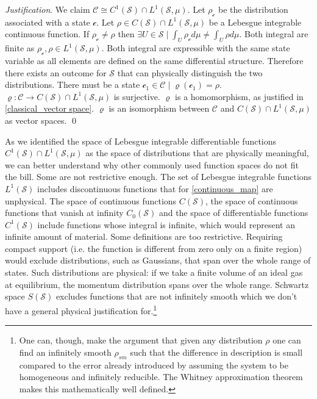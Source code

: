 \documentclass[aps,pra,10pt,twocolumn,floatfix,nofootinbib]{revtex4-1}
\numberwithin{equation}{section}
\theoremstyle{definition}
\newenvironment{justification}{\emph{Justification}.}{\qed}
\begin{document}
\begin{justification}
	We claim $\mathcal{C} \cong C^1(\mathcal{S}) \cap L^1(\mathcal{S}, \mu)$. Let $\rho_\mathcal{c}$ be the distribution associated with a state $\mathcal{c}$. Let $\rho \in C(\mathcal{S}) \cap  L^1(\mathcal{S}, \mu)$ be a Lebesgue integrable continuous function. If $\rho_\mathcal{c} \neq \rho$ then $\exists U \in \mathcal{S} \; | \; \int_{U} \rho_\mathcal{c} d \mu \neq \int_{U} \rho d \mu$. Both integral are finite as $\rho_\mathcal{c}, \rho \in L^1(\mathcal{S}, \mu)$. Both integral are expressible with the same state variable as all elements are defined on the same differential structure. Therefore there exists an outcome for $\mathcal{S}$ that can physically distinguish the two distributions. There must be a state $\mathcal{c}_1 \in \mathcal{C} \; | \; \varrho(\mathcal{c}_1)=\rho$. $\varrho : \mathcal{C} \rightarrow C(\mathcal{S}) \cap  L^1(\mathcal{S}, \mu)$ is surjective. $\varrho$ is a homomorphism, as justified in \ref{classical_vector space}. $\varrho$ is an isomorphism between $\mathcal{C}$ and $C(\mathcal{S}) \cap  L^1(\mathcal{S}, \mu)$ as vector spaces.
\end{justification}

As we identified the space of Lebesgue integrable differentiable functions $C^1(\mathcal{S}) \cap  L^1(\mathcal{S}, \mu)$ as the space of distributions that are physically meaningful, we can better understand why other commonly used function spaces do not fit the bill. Some are not restrictive enough. The set of Lebesgue integrable functions $L^1(\mathcal{S})$ includes discontinuous functions that for \ref{continuous_map} are unphysical. The space of continuous functions $C(\mathcal{S})$, the space of continuous functions that vanish at infinity $C_0(\mathcal{S})$ and the space of differentiable functions $C^1(\mathcal{S})$ include functions whose integral is infinite, which would represent an infinite amount of material. Some definitions are too restrictive. Requiring compact support (i.e. the function is different from zero only on a finite region) would exclude distributions, such as Gaussians, that span over the whole range of states. Such distributions are physical: if we take a finite volume of an ideal gas at equilibrium, the momentum distribution spans over the whole range. Schwartz space $S(\mathcal{S})$ excludes functions that are not infinitely smooth which we don't have a general physical justification for.\footnote{One can, though, make the argument that given any distribution $\rho$ one can find an infinitely smooth $\rho_{sm}$ such that the difference in description is small compared to the error already introduced by assuming the system to be homogeneous and infinitely reducible. The Whitney approximation theorem makes this mathematically well defined.}
\end{document}
